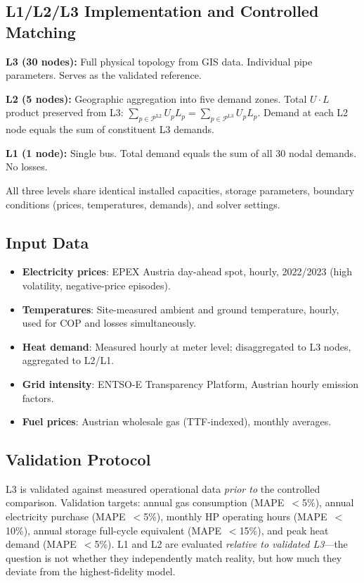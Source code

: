 \documentclass[review,3p]{elsarticle}
\begin{document}
\subsection{L1/L2/L3 Implementation and Controlled Matching}
\label{sec:case_levels}

\textbf{L3 (30 nodes):} Full physical topology from GIS data.
Individual pipe parameters. Serves as the validated reference.

\textbf{L2 (5 nodes):} Geographic aggregation into five demand zones.
Total $U \cdot L$ product preserved from L3:
$\sum_{p \in \mathcal{P}^{\mathrm{L2}}} U_p L_p =
\sum_{p \in \mathcal{P}^{\mathrm{L3}}} U_p L_p$.
Demand at each L2 node equals the sum of constituent L3 demands.

\textbf{L1 (1 node):} Single bus. Total demand equals the sum of
all 30 nodal demands. No losses.

All three levels share identical installed capacities, storage
parameters, boundary conditions (prices, temperatures, demands),
and solver settings.

\subsection{Input Data}
\label{sec:case_data}

\begin{itemize}[nosep]
    \item \textbf{Electricity prices}: EPEX Austria day-ahead spot,
    hourly, 2022/2023 (high volatility, negative-price episodes).
    \item \textbf{Temperatures}: Site-measured ambient and ground
    temperature, hourly, used for COP and losses simultaneously.
    \item \textbf{Heat demand}: Measured hourly at meter level;
    disaggregated to L3 nodes, aggregated to L2/L1.
    \item \textbf{Grid  intensity}: ENTSO-E Transparency
    Platform, Austrian hourly emission factors.
    \item \textbf{Fuel prices}: Austrian wholesale gas (TTF-indexed),
    monthly averages.
\end{itemize}

\subsection{Validation Protocol}
\label{sec:case_validation}

L3 is validated against measured operational data \emph{prior to} the
controlled comparison. Validation targets: annual gas consumption
(MAPE~$<$5\%), annual electricity purchase (MAPE~$<$5\%), monthly HP
operating hours (MAPE~$<$10\%), annual storage full-cycle equivalent
(MAPE~$<$15\%), and peak heat demand (MAPE~$<$5\%). L1 and L2 are
evaluated \emph{relative to validated L3}---the question is not
whether they independently match reality, but how much they deviate
from the highest-fidelity model.
\end{document}
